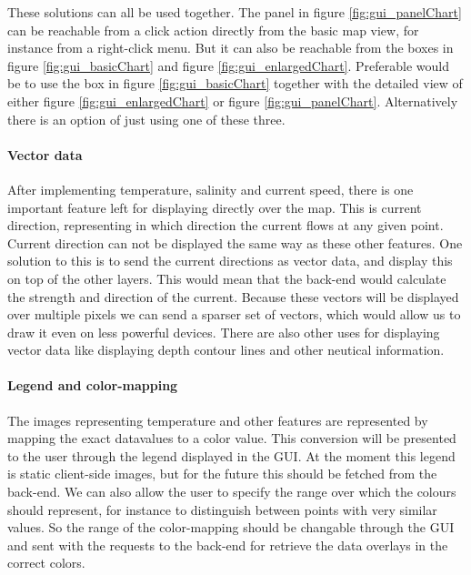 \documentclass[11pt,a4paper,titlepage,oneside]{report}
\begin{document}
These solutions can all be used together. The panel in figure \ref{fig:gui_panelChart} can be reachable from a click action directly from the basic map view, for instance from a right-click menu. But it can also be reachable from the boxes in figure \ref{fig:gui_basicChart} and figure \ref{fig:gui_enlargedChart}. Preferable would be to use the box in figure \ref{fig:gui_basicChart} together with the detailed view of either figure \ref{fig:gui_enlargedChart} or figure \ref{fig:gui_panelChart}. Alternatively there is an option of just using one of these three.

\paragraph{Vector data}
After implementing temperature, salinity and current speed, there is one important feature left for displaying directly over the map. This is current direction, representing in which direction the current flows at any given point. Current direction can not be displayed the same way as these other features. One solution to this is to send the current directions as vector data, and display this on top of the other layers. This would mean that the \gls{back-end} would calculate the strength and direction of the current. Because these vectors will be displayed over multiple pixels we can send a sparser set of vectors, which would allow us to draw it even on less powerful devices.
There are also other uses for displaying vector data like displaying depth contour lines and other neutical information.

\paragraph{Legend and color-mapping}
The images representing temperature and other features are represented by mapping the exact datavalues to a color value. This conversion will be presented to the user through the legend displayed in the \gls{GUI}. At the moment this legend is static client-side images, but for the future this should be fetched from the \gls{back-end}. We can also allow the user to specify the range over which the colours should represent, for instance to distinguish between points with very similar values. So the range of the color-mapping should be changable through the \gls{GUI} and sent with the requests to the \gls{back-end} for retrieve the data overlays in the correct colors.
\end{document}
